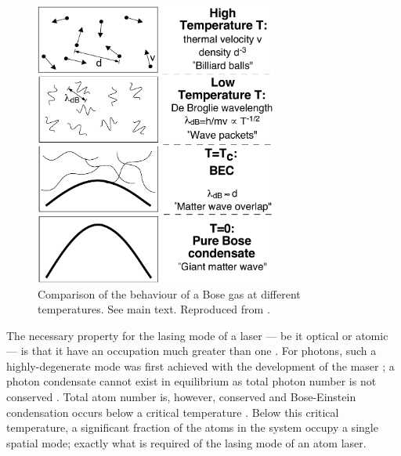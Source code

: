 \begin{figure}
    \centering
    \includegraphics[width=8cm]{WhatIsBEC}
    \caption{
        \label{Introduction:WhatIsBEC}
        Comparison of the behaviour of a Bose gas at different temperatures.  See main text.  Reproduced from \citet{Ketterle:1999fk}.
    }
\end{figure}

The necessary property for the lasing mode of a laser --- be it optical or atomic --- is that it have an occupation much greater than one \citep{Wiseman:1997ba}.  For photons, such a highly-degenerate mode was first achieved with the development of the maser \citep{Gordon:1955}; a photon condensate cannot exist in equilibrium as total photon number is not conserved \citep{Muller:1986,Ketterle:1999fk}.  Total atom number is, however, conserved and Bose-Einstein condensation occurs below a critical temperature \citep{PethickSmith}.  Below this critical temperature, a significant fraction of the atoms in the system occupy a single spatial mode; exactly what is required of the lasing mode of an atom laser.

